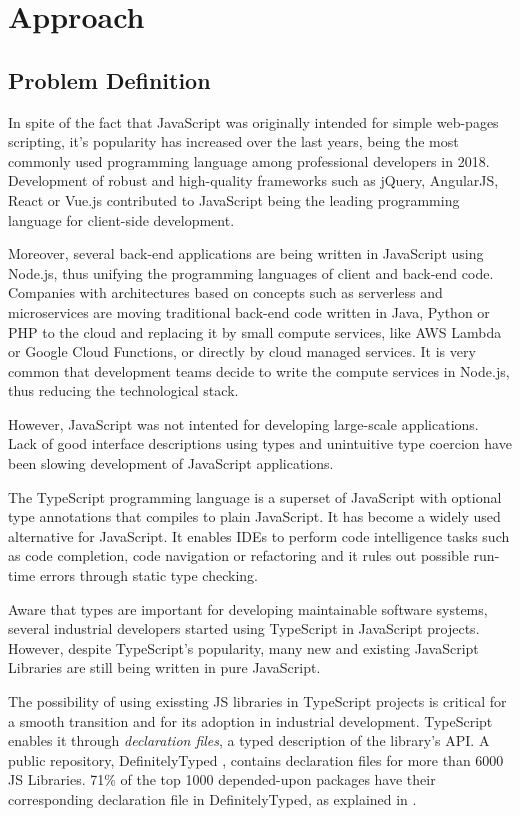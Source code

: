 \chapter{Approach}\label{chap:approach}

\section{Problem Definition}
In spite of the fact that JavaScript was originally intended for simple web-pages scripting, it's popularity has increased over the last years, being the most commonly used programming language among professional developers in 2018. Development of robust and high-quality frameworks such as jQuery, AngularJS, React or Vue.js contributed to JavaScript being the leading programming language for client-side development. 

Moreover, several back-end applications are being written in JavaScript using Node.js, thus unifying the programming languages of client and back-end code. Companies with architectures based on concepts such as serverless and microservices are moving traditional back-end code written in Java, Python or PHP to the cloud and replacing it by small compute services, like AWS Lambda or Google Cloud Functions, or directly by cloud managed services. It is very common that development teams decide to write the compute services in Node.js, thus reducing the technological stack.

However, JavaScript was not intented for developing large-scale applications. Lack of good interface descriptions using types and unintuitive type coercion have been slowing development of JavaScript applications.

The TypeScript programming language is a superset of JavaScript with optional type annotations that compiles to plain JavaScript. It has become a widely used alternative for JavaScript. It enables IDEs to perform code intelligence tasks such as code completion, code navigation or refactoring and it rules out possible run-time errors through static type checking.

Aware that types are important for developing maintainable software systems, several industrial developers started using TypeScript in JavaScript projects. However, despite TypeScript's popularity, many new and existing JavaScript Libraries are still being written in pure JavaScript.

The possibility of using exissting JS libraries in TypeScript projects is critical for a smooth transition and for its adoption in industrial development. TypeScript enables it through \textit{declaration files}, a typed description of the library's API. A public repository, DefinitelyTyped \citep{definitely-typed-repository}, contains declaration files for more than 6000 JS Libraries. 71\% of the top 1000 depended-upon packages have their corresponding declaration file in DefinitelyTyped, as explained in .

